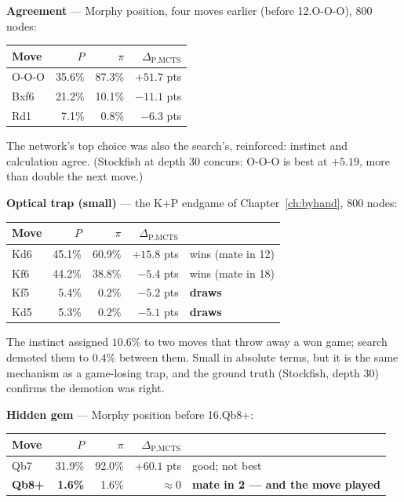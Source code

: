 \begin{realdata}[title={Real engine output: three positions, three verdicts}]
\textbf{Agreement} --- Morphy position, four moves earlier (before 12.O-O-O), 800 nodes:
\begin{center}
\begin{tabular}{@{}lrrr@{}}
\toprule
Move & $P$ & $\pi$ & $\Delta_{\text{P,MCTS}}$ \\
\midrule
O-O-O & 35.6\% & 87.3\% & $+51.7$ pts \\
Bxf6  & 21.2\% & 10.1\% & $-11.1$ pts \\
Rd1   &  7.1\% &  0.8\% & $-6.3$ pts \\
\bottomrule
\end{tabular}
\end{center}
The network's top choice was also the search's, reinforced: instinct and calculation agree.
(Stockfish at depth 30 concurs: O-O-O is best at $+5.19$, more than double the next move.)

\medskip
\textbf{Optical trap (small)} --- the K+P endgame of Chapter~\ref{ch:byhand}, 800 nodes:
\begin{center}
\begin{tabular}{@{}lrrrl@{}}
\toprule
Move & $P$ & $\pi$ & $\Delta_{\text{P,MCTS}}$ & \\
\midrule
Kd6 & 45.1\% & 60.9\% & $+15.8$ pts & wins (mate in 12) \\
Kf6 & 44.2\% & 38.8\% & $-5.4$ pts & wins (mate in 18) \\
Kf5 &  5.4\% &  0.2\% & $-5.2$ pts & \textbf{draws} \\
Kd5 &  5.3\% &  0.2\% & $-5.1$ pts & \textbf{draws} \\
\bottomrule
\end{tabular}
\end{center}
The instinct assigned $10.6\%$ to two moves that throw away a won game; search demoted them
to $0.4\%$ between them. Small in absolute terms, but it is the same mechanism as a
game-losing trap, and the ground truth (Stockfish, depth 30) confirms the demotion was right.

\medskip
\textbf{Hidden gem} --- Morphy position before 16.Qb8+:
\begin{center}
\begin{tabular}{@{}lrrrl@{}}
\toprule
Move & $P$ & $\pi$ & $\Delta_{\text{P,MCTS}}$ & \\
\midrule
Qb7  & 31.9\% & 92.0\% & $+60.1$ pts & good; not best \\
\textbf{Qb8+} & \textbf{1.6\%} & 1.6\% & $\approx 0$ & \textbf{mate in 2 --- and the move played} \\
\bottomrule
\end{tabular}
\end{center}
\end{realdata}

